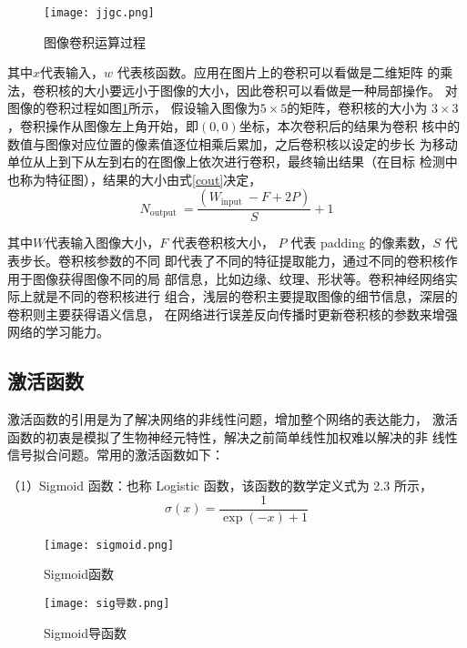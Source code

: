 \begin{figure}[htbp]
    \centering
    \texttt{[image: jjgc.png]}
    \caption{图像卷积运算过程}
    \label{jjgc}
\end{figure}

其中$x$代表输入，$w$ 代表核函数。应用在图片上的卷积可以看做是二维矩阵
的乘法，卷积核的大小要远小于图像的大小，因此卷积可以看做是一种局部操作。
对图像的卷积过程如图\ref{jjgc}所示，
假设输入图像为$5\times5$的矩阵，卷积核的大小为
$3\times3$，卷积操作从图像左上角开始，即$(0,0)$坐标，本次卷积后的结果为卷积
核中的数值与图像对应位置的像素值逐位相乘后累加，之后卷积核以设定的步长
为移动单位从上到下从左到右的在图像上依次进行卷积，最终输出结果（在目标
检测中也称为特征图），结果的大小由式\ref{cout}决定，
\begin{equation}
    N_{\text {output }}=\frac{\left(W_{\text {input }}-F+2 P\right)}{S}+1
    \label{cout}
\end{equation}

其中$W$代表输入图像大小，$F$ 代表卷积核大小， $P$ 代表 padding 的像素数，$S$ 代表步长。卷积核参数的不同
即代表了不同的特征提取能力，通过不同的卷积核作用于图像获得图像不同的局
部信息，比如边缘、纹理、形状等。卷积神经网络实际上就是不同的卷积核进行
组合，浅层的卷积主要提取图像的细节信息，深层的卷积则主要获得语义信息，
在网络进行误差反向传播时更新卷积核的参数来增强网络的学习能力。

\subsection{激活函数}
激活函数的引用是为了解决网络的非线性问题，增加整个网络的表达能力，
激活函数的初衷是模拟了生物神经元特性，解决之前简单线性加权难以解决的非
线性信号拟合问题。常用的激活函数如下：

（1）Sigmoid 函数：也称 Logistic 函数，该函数的数学定义式为 2.3 所示，
\begin{equation}
    \sigma(x)=\frac{1}{\exp (-x)+1}
\end{equation}

\begin{figure}[htbp]
    \centering
    \texttt{[image: sigmoid.png]}
    \caption{Sigmoid函数}
    \label{sig}
\end{figure}

\begin{figure}[htbp]
    \centering
    \texttt{[image: sig导数.png]}
    \caption{Sigmoid导函数}
    \label{sigd}
\end{figure}

